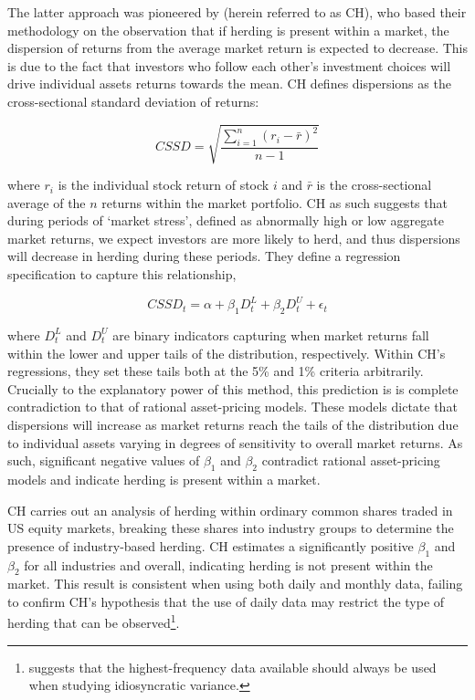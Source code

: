 \documentclass[12pt]{article}
\numberwithin{table}{section}   %
\begin{document}
The latter approach was pioneered by \citet{ch} (herein referred to as CH), who based their methodology on the observation that if herding is present within a market, the dispersion of returns from the average market return is expected to decrease. This is due to the fact that investors who follow each other’s investment choices will drive individual assets returns towards the mean. CH defines dispersions as the cross-sectional standard deviation of returns:

$$
CSSD=\sqrt{\frac{\sum^n_{i=1}{(r_i-\bar{r})^2}}{n-1}}
$$

where $r_i$ is the individual stock return of stock $i$ and $\bar{r}$ is the cross-sectional average of the $n$ returns within the market portfolio. CH as such suggests that during periods of ‘market stress’, defined as abnormally high or low aggregate market returns, we expect investors are more likely to herd, and thus dispersions will decrease in herding during these periods. They define a regression specification to capture this relationship, 

$$
CSSD_t=\alpha+\beta_1D^L_t+\beta_2D^U_t+\epsilon_t
$$

where $D^L_t$ and $D^U_t$ are binary indicators capturing when market returns fall within the lower and upper tails of the distribution, respectively. Within CH’s regressions, they set these tails both at the 5\% and 1\% criteria arbitrarily. Crucially to the explanatory power of this method, this prediction is is complete contradiction to that of rational asset-pricing models. These models dictate that dispersions will increase as market returns reach the tails of the distribution due to individual assets varying in degrees of sensitivity to overall market returns. As such, significant negative values of $\beta_1$ and $\beta_2$ contradict rational asset-pricing models and indicate herding is present within a market.

CH carries out an analysis of herding within ordinary common shares traded in US equity markets, breaking these shares into industry groups to determine the presence of industry-based herding. CH estimates a significantly positive $\beta_1$ and $\beta_2$ for all industries and overall, indicating herding is not present within the market. This result is consistent when using both daily and monthly data, failing to confirm CH’s hypothesis that the use of daily data may restrict the type of herding that can be observed\footnote{\citet{richards} suggests that the highest-frequency data available should always be used when studying idiosyncratic variance.}.
\end{document}
